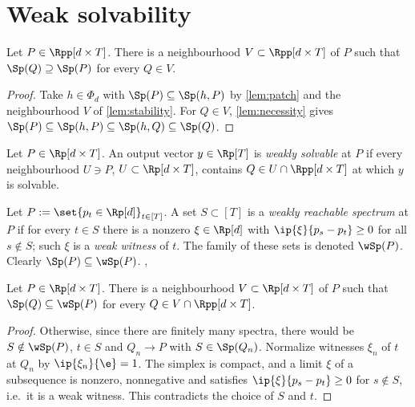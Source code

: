 \section{Weak solvability}\label{sec:weak}

\begin{lemma}[openness]\label{lem:open}
Let $P\in\Rpp[d\times T]$. There is a neighbourhood $V\subset\Rpp[d\times T]$ of $P$ such that $\Sp(Q)\supseteq\Sp(P)$ for every $Q\in V$. \hfill{}
\end{lemma}

\begin{proof}
Take $h\in\Phi_d$ with $\Sp(P)\subseteq\Sp(h,P)$ by \cref{lem:patch} and the neighbourhood $V$ of \cref{lem:stability}. For $Q\in V$, \cref{lem:necessity} gives $\Sp(P)\subseteq\Sp(h,P)\subseteq\Sp(h,Q)\subseteq\Sp(Q)$.
\end{proof}

\begin{definition}\label{def:weak-solvability}
Let $P\in\Rp[d\times T]$. An output vector $y\in\Rp[T]$ is \emph{weakly solvable} at $P$ if every neighbourhood $U\ni P$, $U\subset\Rp[d\times T]$, contains $Q\in U\cap\Rpp[d\times T]$ at which $y$ is solvable. \hfill{}
\end{definition}

\begin{definition}\label{def:weak}
Let $P:=\set{p_t\in\Rp[d]}_{t\in[T]}$. A set $S\subset[T]$ is a \emph{weakly reachable spectrum} at $P$ if for every $t\in S$ there is a nonzero $\xi\in\Rp[d]$ with $\ip{\xi}{p_s-p_t}\ge0$ for all $s\notin S$; such $\xi$ is a \emph{weak witness} of $t$. The family of these sets is denoted $\wSp(P)$. Clearly $\Sp(P)\subseteq\wSp(P)$. \hfill{}, 
\end{definition}

\begin{lemma}[limit]\label{lem:limit}
Let $P\in\Rp[d\times T]$. There is a neighbourhood $V\subset\Rp[d\times T]$ of $P$ such that $\Sp(Q)\subseteq\wSp(P)$ for every $Q\in V\cap\Rpp[d\times T]$. \hfill{}
\end{lemma}

\begin{proof}
Otherwise, since there are finitely many spectra, there would be $S\notin\wSp(P)$, $t\in S$ and $Q_n\to P$ with $S\in\Sp(Q_n)$. Normalize witnesses $\xi_n$ of $t$ at $Q_n$ by $\ip{\xi_n}{\e}=1$. The simplex is compact, and a limit $\xi$ of a subsequence is nonzero, nonnegative and satisfies $\ip{\xi}{p_s-p_t}\ge0$ for $s\notin S$, i.e.\ it is a weak witness. This contradicts the choice of $S$ and $t$.
\end{proof}

